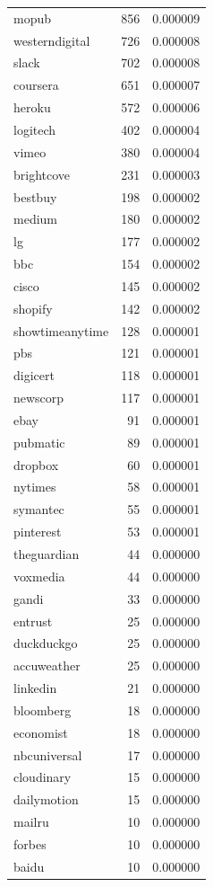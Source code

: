 \begin{tabular}{lrr}
mopub & 856 & 0.000009 \\
westerndigital & 726 & 0.000008 \\
slack & 702 & 0.000008 \\
coursera & 651 & 0.000007 \\
heroku & 572 & 0.000006 \\
logitech & 402 & 0.000004 \\
vimeo & 380 & 0.000004 \\
brightcove & 231 & 0.000003 \\
bestbuy & 198 & 0.000002 \\
medium & 180 & 0.000002 \\
lg & 177 & 0.000002 \\
bbc & 154 & 0.000002 \\
cisco & 145 & 0.000002 \\
shopify & 142 & 0.000002 \\
showtimeanytime & 128 & 0.000001 \\
pbs & 121 & 0.000001 \\
digicert & 118 & 0.000001 \\
newscorp & 117 & 0.000001 \\
ebay & 91 & 0.000001 \\
pubmatic & 89 & 0.000001 \\
dropbox & 60 & 0.000001 \\
nytimes & 58 & 0.000001 \\
symantec & 55 & 0.000001 \\
pinterest & 53 & 0.000001 \\
theguardian & 44 & 0.000000 \\
voxmedia & 44 & 0.000000 \\
gandi & 33 & 0.000000 \\
entrust & 25 & 0.000000 \\
duckduckgo & 25 & 0.000000 \\
accuweather & 25 & 0.000000 \\
linkedin & 21 & 0.000000 \\
bloomberg & 18 & 0.000000 \\
economist & 18 & 0.000000 \\
nbcuniversal & 17 & 0.000000 \\
cloudinary & 15 & 0.000000 \\
dailymotion & 15 & 0.000000 \\
mailru & 10 & 0.000000 \\
forbes & 10 & 0.000000 \\
baidu & 10 & 0.000000 \\

\end{tabular}
